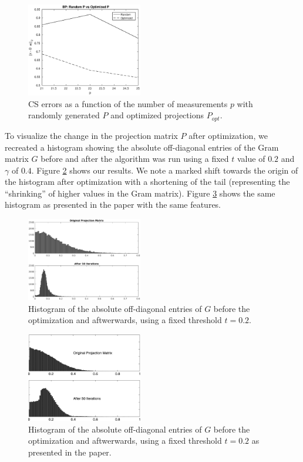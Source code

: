 \documentclass[journal]{IEEEtran}
\begin{document}
\begin{figure}[]
  \centering
  \includegraphics[width=0.45\textwidth]{rel_errors.eps}
  \caption{CS errors as a function of the number of measurements $p$ with randomly generated $P$ and optimized projections $P_{opt}$.}
  \label{fig:err}
\end{figure}

To visualize the change in the projection matrix $P$ after optimization, we recreated a histogram showing the absolute off-diagonal entries of the Gram matrix $G$ before and after the algorithm was run using a fixed $t$ value of $0.2$ and $\gamma$ of $0.4$.  Figure \ref{fig:hist} shows our results.  We note a marked shift towards the origin of the histogram after optimization with a shortening of the tail (representing the ``shrinking'' of higher values in the Gram matrix).  Figure \ref{fig:hist_from_paper} shows the same histogram as presented in the paper with the same features.

\begin{figure}[]
  \centering
  \includegraphics[width=0.45\textwidth]{hist_bw.eps}
  \caption{Histogram of the absolute off-diagonal entries of $G$ before the optimization and aftwerwards, using a fixed threshold $t = 0.2$.}
  \label{fig:hist}
\end{figure}

\begin{figure}[]
  \centering
  \includegraphics[width=0.45\textwidth]{hist_from_paper.eps}
  \caption{Histogram of the absolute off-diagonal entries of $G$ before the optimization and aftwerwards, using a fixed threshold $t = 0.2$ as presented in the paper.}
  \label{fig:hist_from_paper}
\end{figure}
\end{document}
